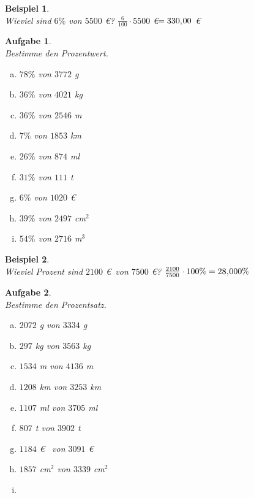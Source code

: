 \documentclass[12pt,fleqn]{article}
\theoremstyle{aufg}
\newtheorem{aufgabe}{Aufgabe}
\theoremstyle{bsp}
\newtheorem{beispiel}{Beispiel}
\begin{document}
 
    \begin{flushleft}
\begin{beispiel} ~ \\ 
Wieviel sind $6\%$ von $5500$ \euro? $\frac{6}{100}\cdot 5500$ \euro $ = 330,\hspace{-1pt}00$ \euro\end{beispiel} 
\begin{aufgabe} ~ \\ 
Bestimme den Prozentwert.\begin{multicols}{3} 
\begin{enumerate}[a)] 
\item 
$78\%$ von $3772$ g
\item 
$36\%$ von $4021$ kg
\item 
$36\%$ von $2546$ m
\item 
$7\%$ von $1853$ km
\item 
$26\%$ von $874$ ml
\item 
$31\%$ von $111$ t
\item 
$6\%$ von $1020$ \euro~
\item 
$39\%$ von $2497$ cm$^2$
\item 
$54\%$ von $2716$ m$^3$
\end{enumerate} 
\end{multicols} 
\end{aufgabe} 
\begin{beispiel} ~ \\ 
Wieviel Prozent sind $2100$ \euro~von $7500$ \euro? $\frac{2100}{7500}\cdot 100\%  = 28,\hspace{-1pt}000\%$ \end{beispiel} 
\begin{aufgabe} ~ \\ 
Bestimme den Prozentsatz.\begin{multicols}{3} 
\begin{enumerate}[a)] 
\item 
$2072$ g von $3334$ g
\item 
$297$ kg von $3563$ kg
\item 
$1534$ m von $4136$ m
\item 
$1208$ km von $3253$ km
\item 
$1107$ ml von $3705$ ml
\item 
$807$ t von $3902$ t
\item 
$1184$ \euro~ von $3091$ \euro~
\item 
$1857$ cm$^2$ von $3339$ cm$^2$
\item 

\end{enumerate}
\end{multicols}
\end{aufgabe}
\end{flushleft}
\end{document}
